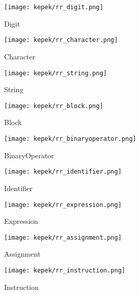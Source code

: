 
\begin{figure}[h!]
\centering
\texttt{[image: kepek/rr\_digit.png]}
\caption{Digit}
\label{fig:rr_digit}
\end{figure}

\begin{figure}[h!]
\centering
\texttt{[image: kepek/rr\_character.png]}
\caption{Character}
\label{fig:rr_character}
\end{figure}

\begin{figure}[h!]
\centering
\texttt{[image: kepek/rr\_string.png]}
\caption{String}
\label{fig:rr_string}
\end{figure}

\begin{figure}[h!]
\centering
\texttt{[image: kepek/rr\_block.png]}
\caption{Block}
\label{fig:rr_block}
\end{figure}

\begin{figure}[h!]
\centering
\texttt{[image: kepek/rr\_binaryoperator.png]}
\caption{BinaryOperator}
\label{fig:rr_binaryoperator}
\end{figure}

\begin{figure}[h!]
\centering
\texttt{[image: kepek/rr\_identifier.png]}
\caption{Identifier}
\label{fig:rr_identifier}
\end{figure}

\begin{figure}[h!]
\centering
\texttt{[image: kepek/rr\_expression.png]}
\caption{Expression}
\label{fig:rr_expression}
\end{figure}

\begin{figure}[h!]
\centering
\texttt{[image: kepek/rr\_assignment.png]}
\caption{Assignment}
\label{fig:rr_assignment}
\end{figure}

\begin{figure}[h!]
\centering
\texttt{[image: kepek/rr\_instruction.png]}
\caption{Instruction}
\label{fig:rr_instruction}
\end{figure}

